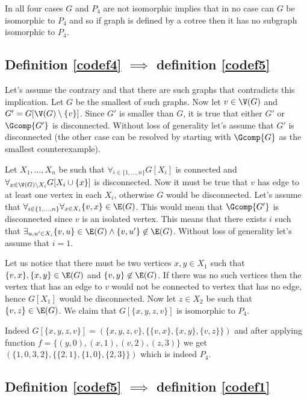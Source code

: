 In all four cases $G$ and $P_4$ are not isomorphic implies that in no case can $G$ be isomorphic to $P_4$ and so if graph is defined by a cotree then it has no subgraph isomorphic to $P_4$.

\subsection{Definition \ref{codef4} $\implies$ definition \ref{codef5}}

Let's assume the contrary and that there are such graphs that contradicts this implication. Let $G$ be the smallest of such graphs. Now let $v \in \V(G)$ and $G' = G[\V(G) \setminus \{v\}]$. Since $G'$ is smaller than $G$, it is true that either $G'$ or $\Gcomp{G'}$ is disconnected. Without loss of generality let's assume that $G'$ is disconnected (the other case can be resolved by starting with $\Gcomp{G}$ as the smallest counterexample).

Let $X_1, \ldots, X_n$ be such that $\forall_{i \in \{1, \ldots, n\}} G[X_i]$ is connected and $\forall_{x \in \V(G) \setminus X_i} G[X_i \cup \{x\}]$ is disconnected. Now it must be true that $v$ has edge to at least one vertex in each $X_i$, otherwise $G$ would be disconnected. Let's assume that $\forall_{i \in \{1,\ldots,n\}} \forall_{x \in X_i} \{v,x\} \in \E(G)$. This would mean that $\Gcomp{G'}$ is disconnected since $v$ is an isolated vertex. This means that there exists $i$ such that $\exists_{u, u' \in X_i} \{v, u\} \in \E(G) \land \{v, u'\} \not\in \E(G)$. Without loss of generality let's assume that $i = 1$.

Let us notice that there must be two vertices $x, y \in X_1$ such that $\{v, x\}, \{x, y\} \in \E(G)$ and $\{v,y\} \not\in \E(G)$. If there was no such vertices then the vertex that has an edge to $v$ would not be connected to vertex that has no edge, hence $G[X_1]$ would be disconnected. Now let $z \in X_2$ be such that $\{v, z\} \in \E(G)$. We claim that $G[\{x,y,z,v\}]$ is isomorphic to $P_4$.

Indeed $G[\{x,y,z,v\}] = (\{x,y,z,v\}, \{\{v,x\}, \{x, y\}, \{v,z\}\})$ and after applying function $f = \{(y, 0), (x, 1), (v, 2), (z, 3)\}$ we get $(\{1,0,3,2\}, \{\{2,1\}, \{1, 0\}, \{2,3\}\})$ which is indeed $P_4$.

\subsection{Definition \ref{codef5} $\implies$ definition \ref{codef1}}

